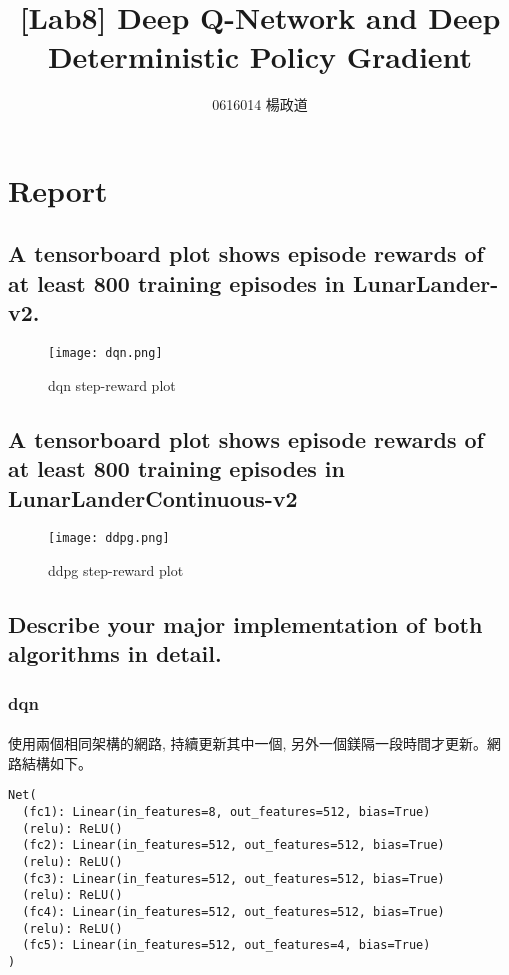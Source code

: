 \title{[Lab8] Deep Q-Network and Deep Deterministic Policy Gradient}
\author{0616014 楊政道}
\maketitle
\thispagestyle{fancy}
\section{Report}
\subsection{A tensorboard plot shows episode rewards of at least 800 training episodes in LunarLander-v2.}
\begin{figure}[!ht]
    \begin{center}
        \texttt{[image: dqn.png]}
        \caption{dqn step-reward plot}
    \end{center}
\end{figure}
\subsection{A tensorboard plot shows episode rewards of at least 800 training episodes in LunarLanderContinuous-v2}
\begin{figure}[!ht]
    \begin{center}
        \texttt{[image: ddpg.png]}
        \caption{ddpg step-reward plot}
    \end{center}
\end{figure}
\subsection{Describe your major implementation of both algorithms in detail.}
\subsubsection{dqn}
\paragraph{}
使用兩個相同架構的網路, 持續更新其中一個, 另外一個鎂隔一段時間才更新。網路結構如下。
\begin{lstlisting}
Net( 
  (fc1): Linear(in_features=8, out_features=512, bias=True)
  (relu): ReLU()
  (fc2): Linear(in_features=512, out_features=512, bias=True)
  (relu): ReLU()
  (fc3): Linear(in_features=512, out_features=512, bias=True) 
  (relu): ReLU()
  (fc4): Linear(in_features=512, out_features=512, bias=True)
  (relu): ReLU()
  (fc5): Linear(in_features=512, out_features=4, bias=True)
)
\end{lstlisting}
